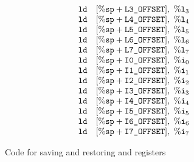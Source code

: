 \begin{figure*}[!t]
{\begin{minipage}[b]{0.5\textwidth}
\[\begin{array}{ll}
                \texttt{ld} & [\%\texttt{sp} + \texttt{L3\_OFFSET}], \ \%\texttt{l}_{3} \\
                \texttt{ld} & [\%\texttt{sp} + \texttt{L4\_OFFSET}], \ \%\texttt{l}_{4} \\
                \texttt{ld} & [\%\texttt{sp} + \texttt{L5\_OFFSET}], \ \%\texttt{l}_{5} \\
                \texttt{ld} & [\%\texttt{sp} + \texttt{L6\_OFFSET}], \ \%\texttt{l}_{6} \\
                \texttt{ld} & [\%\texttt{sp} + \texttt{L7\_OFFSET}], \ \%\texttt{l}_{7} \\
                \texttt{ld} & [\%\texttt{sp} + \texttt{I0\_OFFSET}], \ \%\texttt{i}_{0} \\
                \texttt{ld} & [\%\texttt{sp} + \texttt{I1\_OFFSET}], \ \%\texttt{i}_{1} \\
                \texttt{ld} & [\%\texttt{sp} + \texttt{I2\_OFFSET}], \ \%\texttt{i}_{2} \\
                \texttt{ld} & [\%\texttt{sp} + \texttt{I3\_OFFSET}], \ \%\texttt{i}_{3} \\
                \texttt{ld} & [\%\texttt{sp} + \texttt{I4\_OFFSET}], \ \%\texttt{i}_{4} \\
                \texttt{ld} & [\%\texttt{sp} + \texttt{I5\_OFFSET}], \ \%\texttt{i}_{5} \\
                \texttt{ld} & [\%\texttt{sp} + \texttt{I6\_OFFSET}], \ \%\texttt{i}_{6} \\
                \texttt{ld} & [\%\texttt{sp} + \texttt{I7\_OFFSET}], \ \%\texttt{i}_{7}
            \end{array}
        \]
        \end{minipage}
    }
    \caption{Code for saving and restoring \localRN{} and \inRN{} registers}
    \label{fig:code for saving and restoring local and in}
\end{figure*}
